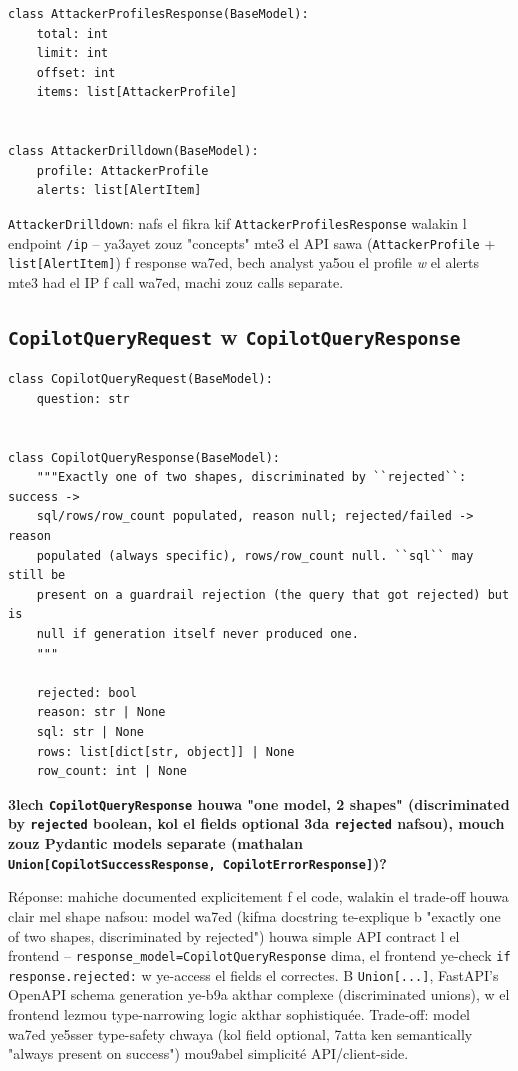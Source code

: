 \documentclass[11pt,a4paper]{report}
\DeclareRobustCommand{\code}[1]{\texttt{#1}}
\begin{document}
\begin{lstlisting}[style=pystyle]
class AttackerProfilesResponse(BaseModel):
    total: int
    limit: int
    offset: int
    items: list[AttackerProfile]


class AttackerDrilldown(BaseModel):
    profile: AttackerProfile
    alerts: list[AlertItem]
\end{lstlisting}

\code{AttackerDrilldown}: nafs el fikra kif \code{AttackerProfilesResponse}
walakin l endpoint \code{/{ip}} -- ya3ayet zouz "concepts" mte3 el API
sawa (\code{AttackerProfile} + \code{list[AlertItem]}) f response wa7ed,
bech analyst ya5ou el profile \emph{w} el alerts mte3 had el IP f call
wa7ed, machi zouz calls separate.

\subsection{\code{CopilotQueryRequest} w \code{CopilotQueryResponse}}

\begin{lstlisting}[style=pystyle]
class CopilotQueryRequest(BaseModel):
    question: str


class CopilotQueryResponse(BaseModel):
    """Exactly one of two shapes, discriminated by ``rejected``: success ->
    sql/rows/row_count populated, reason null; rejected/failed -> reason
    populated (always specific), rows/row_count null. ``sql`` may still be
    present on a guardrail rejection (the query that got rejected) but is
    null if generation itself never produced one.
    """

    rejected: bool
    reason: str | None
    sql: str | None
    rows: list[dict[str, object]] | None
    row_count: int | None
\end{lstlisting}

\begin{soual}
\textbf{3lech \code{CopilotQueryResponse} houwa "one model, 2 shapes"
(discriminated by \code{rejected} boolean, kol el fields optional 3da
\code{rejected} nafsou), mouch zouz Pydantic models separate (mathalan
\code{Union[CopilotSuccessResponse, CopilotErrorResponse]})?}

Réponse: mahiche documented explicitement f el code, walakin el trade-off
houwa clair mel shape nafsou: model wa7ed (kifma docstring te-explique
b "exactly one of two shapes, discriminated by rejected") houwa simple
API contract l el frontend -- \code{response\_model=CopilotQueryResponse}
dima, el frontend ye-check \code{if response.rejected:} w ye-access
el fields el correctes. B \code{Union[...]}, FastAPI's OpenAPI schema
generation ye-b9a akthar complexe (discriminated unions), w el frontend
lezmou type-narrowing logic akthar sophistiquée. Trade-off: model wa7ed
ye5sser type-safety chwaya (kol field optional, 7atta ken semantically
"always present on success") mou9abel simplicité API/client-side.
\end{soual}
\end{document}
